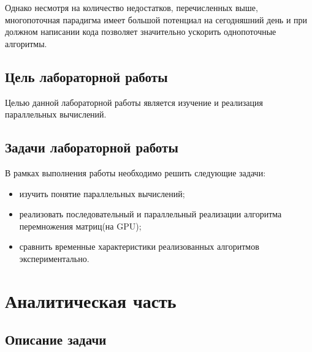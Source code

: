 \documentclass[12pt]{report}
\begin{document}
Однако несмотря на количество недостатков, перечисленных выше, многопоточная парадигма имеет большой потенциал на сегодняшний день и при должном написании кода позволяет значительно ускорить однопоточные алгоритмы.

\section*{Цель лабораторной работы}
Целью данной лабораторной работы является изучение и реализация параллельных вычислений.

\section*{Задачи лабораторной работы}
\indent В рамках выполнения работы необходимо решить следующие задачи:

\begin{itemize}

	\item изучить понятие параллельных вычислений;

	\item реализовать последовательный и  параллельный реализации алгоритма перемножения матриц(на GPU);

	\item сравнить временные характеристики реализованных алгоритмов экспериментально.
\end{itemize}

\chapter{Аналитическая часть}

\section{Описание задачи}
\end{document}
